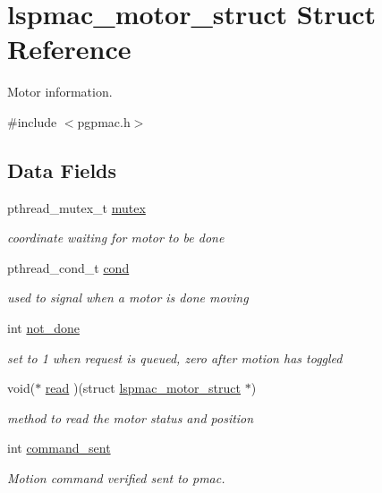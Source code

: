 \hypertarget{structlspmac__motor__struct}{\section{lspmac\-\_\-motor\-\_\-struct Struct Reference}
\label{structlspmac__motor__struct}
}


Motor information.  




{\ttfamily \#include $<$pgpmac.\-h$>$}

\subsection*{Data Fields}
\begin{DoxyCompactItemize}
\item 
pthread\-\_\-mutex\-\_\-t \hyperlink{structlspmac__motor__struct_a188c5b1e991750ce2ffd53e0192e0907}{mutex}
\begin{DoxyCompactList}\small\item\em coordinate waiting for motor to be done \end{DoxyCompactList}\item 
pthread\-\_\-cond\-\_\-t \hyperlink{structlspmac__motor__struct_aa0ea4108b8fed5b41ff91ca7266f3d84}{cond}
\begin{DoxyCompactList}\small\item\em used to signal when a motor is done moving \end{DoxyCompactList}\item 
int \hyperlink{structlspmac__motor__struct_ab7bd8bff48953ce05c758598d75877ac}{not\-\_\-done}
\begin{DoxyCompactList}\small\item\em set to 1 when request is queued, zero after motion has toggled \end{DoxyCompactList}\item 
void($\ast$ \hyperlink{structlspmac__motor__struct_ac62692eb939c04ca35e939d1c3acfe8f}{read} )(struct \hyperlink{structlspmac__motor__struct}{lspmac\-\_\-motor\-\_\-struct} $\ast$)
\begin{DoxyCompactList}\small\item\em method to read the motor status and position \end{DoxyCompactList}\item 
int \hyperlink{structlspmac__motor__struct_a59a7f007476b2428fd3c5bd7f24440e8}{command\-\_\-sent}
\begin{DoxyCompactList}\small\item\em Motion command verified sent to pmac. \end{DoxyCompactList}\item 

\end{DoxyCompactItemize}
